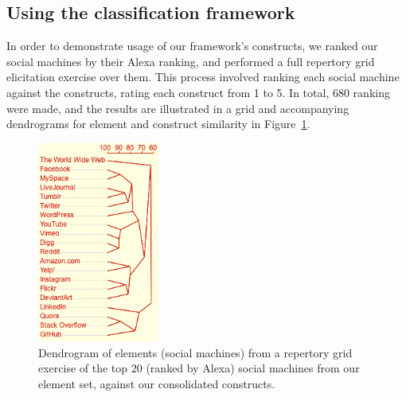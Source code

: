 \documentclass{sig-alternate}
\begin{document}

\subsection{Using the classification framework}

In order to demonstrate usage of our framework's constructs, we ranked our social machines
by their Alexa ranking, and performed a full repertory grid elicitation exercise over them.
This process involved ranking each social machine against the constructs, rating each construct
from 1 to 5. In total, 680 ranking were made, and the
results are illustrated in a grid and accompanying dendrograms for element and construct
similarity in Figure~\ref{dendrogram}.

\begin{figure}[htb]
\begin{center}
\includegraphics[width=4cm]{img/dendrogram-elements.png}
\caption{Dendrogram of elements (social machines) from a repertory grid exercise of the top 20 (ranked by Alexa) social machines from our element set, against our consolidated constructs.} \label{dendrogram}
\end{center}
\end{figure}
\end{document}
